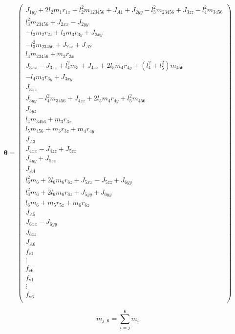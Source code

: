 {\footnotesize
\begin{equation}
\label{eq:Parametersatz}
	\boldsymbol{\theta} = 
		\begin{pmatrix}
			J_{1yy} + 2 l_2 m_1 r_{1x} + l_2^2 m_{123456} + J_{A1} + J_{2yy} - l_3^2 m_{23456} + J_{3zz} - l_4^2 m_{3456} \\
			l_3^2 m_{23456} + J_{2xx} - J_{2yy} \\
			- l_3 m_2 r_{2z} + l_3 m_3 r_{3y} + J_{2xy} \\
			- l_3^2 m_{23456} + J_{2zz} + J_{A2} \\
			l_3 m_{23456} + m_2 r_{2x} \\
			J_{3xx} -J_{3zz} + l_4^2 m_3 + J_{4zz} + 2 l_5 m_4 r_{4y} + (l_4^2 +l_5^2) m_{456} \\
			-l_4 m_3 r_{3y} + J_{3xy} \\
			J_{3xz} \\
			J_{3yy} - l_4^2 m_{3456} + J_{4zz} + 2l_5 m_4 r_{4y} + l_5^2 m_{456} \\
			J_{3yz} \\
			l_4 m_{3456} + m_3 r_{3x} \\
			l_5 m_{456} + m_3 r_{3z} + m_4 r_{4y} \\
			J_{A3} \\
			J_{4xx} - J_{4zz} + J_{5zz} \\
			J_{4yy} + J_{5zz} \\
			J_{A4} \\
			l_6^2 m_6 + 2 l_6 m_6 r_{6z} + J_{5xx} - J_{5zz} + J_{6yy} \\
			l_6^2 m_6 + 2 l_6 m_6 r_{6z} + J_{5yy} + J_{6yy} \\
			l_6 m_6 + m_5 r_{5z} + m_6 r_{6z} \\
			J_{A5} \\
			J_{6xx} - J_{6yy} \\
			J_{6zz} \\
			J_{A6} \\
			
			f_{\mathrm{c}1} \\
			\vdots \\
			f_{\mathrm{c}6} \\
			
			f_{\mathrm{v}1} \\
            \vdots \\
			f_{\mathrm{v}6} \\
		\end{pmatrix}
\end{equation}
}


\begin{equation}
\label{eq:MassenSumme}
    m_{j..6}=\sum_{i=j}^{6} m_i
\end{equation}